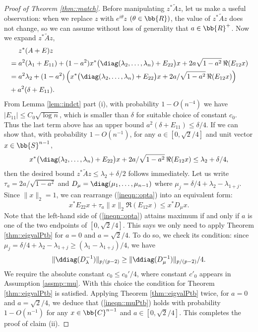\documentclass[12pt]{article}%
\theoremstyle{plain}%
\theoremstyle{remark}
\begin{document}
\begin{proof}[Proof of Theorem \ref{thm::match}]
Before manipulating $z^* \tilde{A} z$, let us make a useful observation: when we replace $z$ with $e^{i \theta}z$ $(\theta \in \bb{R})$, the value of $z^* \tilde{A} z $ does not change, so we can assume without loss of generality that $a \in \bb{R}^+$. Now we expand $z^* \tilde{A} z$,
\begin{align*}
& ~~~~ z^* ( A + E ) z \\
&= a^2 (\lambda_1 + E_{11}) + (1 - a^2)x^* \big( \diag(\lambda_2,\ldots,\lambda_n)+E_{22} \big) x +  2 a \sqrt{1 - a^2}\, \Re(E_{12}x) \\
&= a^2 \lambda_2 +( 1 - a^2) \left( x^* \big( \diag(\lambda_2,\ldots,\lambda_n)+E_{22} \big) x + 2a/\sqrt{1-a^2}\,  \Re(E_{12}x) \right)   \\
&+  a^2 (\delta + E_{11}).
\end{align*}
From Lemma \ref{lem::indct} part (i), with probability $1 - O(n^{-4})$ we have $|E_{11}| \le C_0\sqrt{\log n}$, which is smaller than $\delta$ for suitable choice of constant $c_0$. Thus the last term above has an upper bound $a^2 (\delta + E_{11}) \le \delta / 4$. If we can show that, with probability $1 - O(n^{-1})$, for any $a \in [0,\sqrt{2}/4]$ and unit vector $x \in \bb{S}^{n-1}$,
\begin{equation}\label{ineqn::opta}
x^* \big( \diag(\lambda_2,\ldots,\lambda_n)+E_{22} \big) x + 2a/\sqrt{1-a^2}\,  \Re(E_{12}x) \le  \lambda_2 + \delta/4, 
\end{equation}
then the desired bound $z^* \tilde{A} z \le \lambda_2 + \delta/2$ follows immediately. Let us write $\tau_a = 2a/\sqrt{1-a^2}$ and $D_\mu = \diag(\mu_1,\ldots, \mu_{n-1})$ where $\mu_j = \delta/4 + \lambda_2 - \lambda_{1+j}$. Since $\| x \|_2 = 1$, we can rearrange (\ref{ineqn::opta}) into an equivalent form:
\begin{equation}\label{ineqn::muPtb}
x^* E_{22} x + \tau_a \| x \|_2 \Re(E_{12}x) \le x^* D_\mu x.
\end{equation}
Note that the left-hand side of (\ref{ineqn::opta}) attains maximum if and only if $a$ is one of the two endpoints of $[0,\sqrt{2}/4]$. This says we only need to apply Theorem \ref{thm::eigvalPtb} for $a=0$ and $a = \sqrt{2}/4$. To do so, we check its condition: since $\mu_j = \delta/4 + \lambda_2 - \lambda_{1+j} \ge (\lambda_1 - \lambda_{1+j})/4$, we have
\begin{equation*}
\| \ddiag(D_\lambda^{-1}) \|_{p/(p-2)} \ge \| \ddiag(D_\mu^{-1}) \|_{p/(p-2)}/4.
\end{equation*}
We require the absolute constant $c_0 \le c_0'/4$, where constant $c'_0$ appears in Assumption \ref{assmp::mu}. With this choice the condition for Theorem \ref{thm::eigvalPtb} is satisfied. Applying Theorem \ref{thm::eigvalPtb} twice, for $a = 0$ and $a = \sqrt{2}/4$, we deduce that (\ref{ineqn::muPtb}) holds with probability $1 - O(n^{-1})$ for any $x \in \bb{C}^{n-1}$ and $a \in [0, \sqrt{2}/4 ]$. This completes the proof of claim (ii).

\end{proof}
\end{document}
